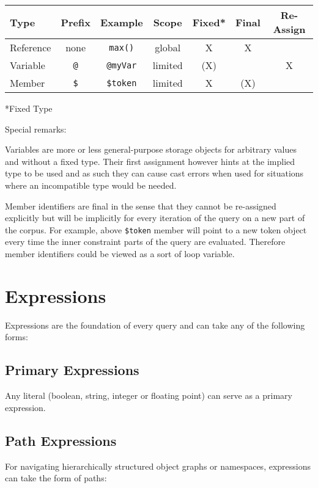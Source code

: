 \documentclass[11pt]{article}
\begin{document}
\begin{tabular}{|l|c|c|c|c|c|c|}
	\hline 
Type	& Prefix & Example & Scope & Fixed* & Final & Re-Assign \\ 
	\hline 
Reference	& none & \texttt{max()} & global & X & X &  \\ 
	\hline 
Variable	& \texttt{@} & \texttt{@myVar} & limited & (X) &  & X \\ 
	\hline 
Member	& \texttt{\$} & \texttt{\$token} & limited & X & (X) &  \\ 
	\hline 
\end{tabular} 

*Fixed Type

Special remarks:

Variables are more or less general-purpose storage objects for arbitrary values and without a fixed type. Their first assignment however hints at the implied type to be used and as such they can cause cast errors when used for situations where an incompatible type would be needed.

Member identifiers are final in the sense that they cannot be re-assigned explicitly but will be implicitly for every iteration of the query on a new part of the corpus. For example, above \texttt{\$token} member will point to a new token object every time the inner constraint parts of the query are evaluated. Therefore member identifiers could be viewed as a sort of loop variable. 

\section{Expressions}
\label{sec:expressions}

Expressions are the foundation of every query and can take any of the following forms:

\subsection{Primary Expressions}
\label{sec:primary-expressions}

Any literal (boolean, string, integer or floating point) can serve as a primary expression.

\subsection{Path Expressions}
\label{sec:path-expressions}

For navigating hierarchically structured object graphs or namespaces, expressions can take the form of paths:
\end{document}
